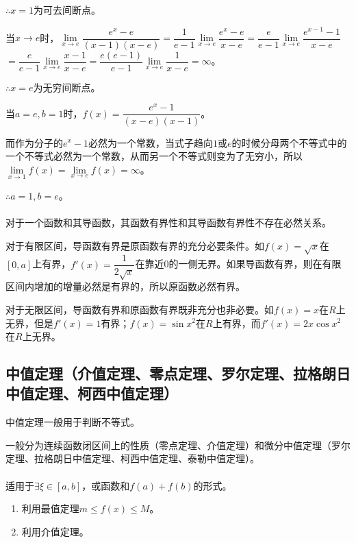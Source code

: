 $\therefore x=1$为可去间断点。\medskip

    当$x\to e$时，$\lim\limits_{x\to e}\dfrac{e^x-e}{(x-1)(x-e)}$$=\dfrac{1}{e-1}\lim\limits_{x\to e}\dfrac{e^x-e}{x-e}$$=\dfrac{e}{e-1}\lim\limits_{x\to e}\dfrac{e^{x-1}-1}{x-e}$\medskip$=\dfrac{e}{e-1}\lim\limits_{x\to e}\dfrac{x-1}{x-e}$$=\dfrac{e(e-1)}{e-1}\lim\limits_{x\to e}\dfrac{1}{x-e}=\infty$。\medskip

$\therefore x=e$为无穷间断点。\medskip

    当$a=e,b=1$时，$f(x)=\dfrac{e^x-1}{(x-e)(x-1)}$。\medskip

    而作为分子的$e^x-1$必然为一个常数，当式子趋向$1$或$e$的时候分母两个不等式中的一个不等式必然为一个常数，从而另一个不等式则变为了无穷小，所以$\lim\limits_{x\to 1}f(x)=\lim\limits_{x\to e}f(x)=\infty$。

$\therefore a=1,b=e$。

\paragraph{}

对于一个函数和其导函数，其函数有界性和其导函数有界性不存在必然关系。

对于有限区间，导函数有界是原函数有界的充分必要条件。如$f(x)=\sqrt{x}$在$[0,a]$上有界，$f'(x)=\dfrac{1}{2\sqrt{x}}$在靠近0的一侧无界。如果导函数有界，则在有限区间内增加的增量必然是有界的，所以原函数必然有界。

对于无限区间，导函数有界和原函数有界既非充分也非必要。如$f(x)=x$在$R$上无界，但是$f'(x)=1$有界；$f(x)=\sin x^2$在$R$上有界，而$f'(x)=2x\cos x^2$在$R$上无界。

\subsection{中值定理（介值定理、零点定理、罗尔定理、拉格朗日中值定理、柯西中值定理）}

中值定理一般用于判断不等式。

一般分为连续函数闭区间上的性质（零点定理、介值定理）和微分中值定理（罗尔定理、拉格朗日中值定理、柯西中值定理、泰勒中值定理）。

\paragraph{}

适用于$\exists\xi\in[a,b]$，或函数和$f(a)+f(b)$的形式。

\begin{enumerate}
    \item 利用最值定理$m\leqslant f(x)\leqslant M$。
    \item 利用介值定理。
\end{enumerate}

